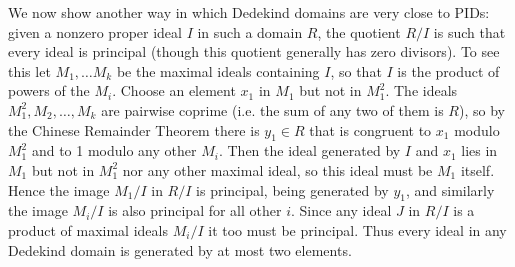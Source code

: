 We now show another way in which Dedekind domains are very close to PIDs:  given a nonzero proper ideal $I$ in such a domain $R$, the quotient $R/I$ is such that every ideal is principal (though this quotient generally has zero divisors).  To see this let $M_1,\ldots M_k$ be the maximal ideals containing $I$, so that $I$ is the product of powers of the $M_i$.  Choose an element $x_1$ in $M_1$ but not in $M_1^2$.  The ideals $M_1^2,M_2,\ldots,M_k$ are pairwise coprime (i.e. the sum of any two of them is $R$), so by the Chinese Remainder Theorem there is $y_1\in R$ that is congruent to
$x_1$ modulo $M_1^2$ and to 1 modulo any other $M_i$.  Then the ideal generated by $I$ and $x_1$ lies in $M_1$ but not in $M_1^2$ nor any other maximal ideal, so this ideal must be $M_1$ itself.  Hence the image $M_1/I$ in $R/I$ is principal, being generated by $y_1$, and similarly the image $M_i/I$ is also principal for all other $i$.  Since any ideal $J$ in $R/I$ is a product of maximal ideals $M_i/I$ it too must be principal.  Thus every ideal in any Dedekind domain is generated by at most two elements.  

